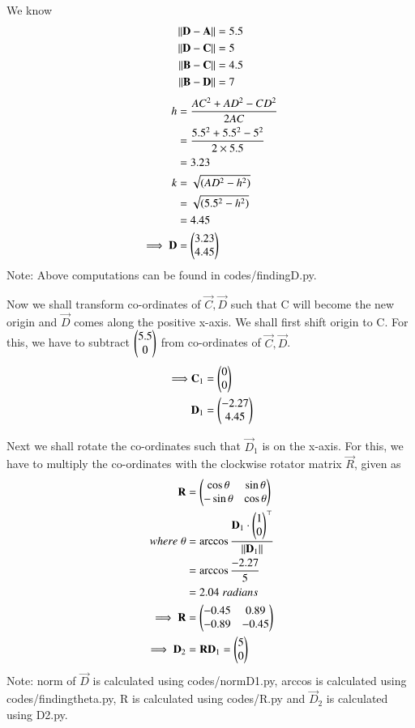 \documentclass[journal,12pt,twocolumn]{IEEEtran}
\begin{document}
We know 
\begin{align}
    \lVert\mathbf{D}-\mathbf{A}\rVert &= 5.5\label{DA}\\
    \lVert\mathbf{D}-\mathbf{C}\rVert &= 5\label{DC}\\
    \lVert\mathbf{B}-\mathbf{C}\rVert &= 4.5\label{BC}\\
    \lVert\mathbf{B}-\mathbf{D}\rVert &= 7\label{BD}
\end{align}
\begin{align}
    h &= \dfrac{AC^2+AD^2-CD^2}{2AC}\\
      &= \dfrac{5.5^2+5.5^2-5^2}{2\times 5.5}\\
      &= 3.23\\
    k &= \sqrt{(AD^2-h^2)}\\
      &= \sqrt{(5.5^2-h^2)}\\
      &= 4.45\\
    \implies \mathbf{D} &= \begin{pmatrix}3.23\\4.45\end{pmatrix}
\end{align}
Note: Above computations can be found in codes/finding\textunderscore D.py.

Now we shall transform co-ordinates of $\vec{C}, \vec{D}$ such that C will become the new origin and $\vec{D}$ comes along the positive x-axis. We shall first shift origin to C. For this, we have to subtract $\begin{pmatrix}5.5\\0\end{pmatrix}$ from co-ordinates of $\vec{C}, \vec{D}$.
\begin{align}
    \implies &\mathbf{C}_1 = \begin{pmatrix}0\\0\end{pmatrix}\\
    &\mathbf{D}_1 = \begin{pmatrix}-2.27\\4.45\end{pmatrix}
\end{align}

Next we shall rotate the co-ordinates such that $\vec{D}_1$ is on the x-axis. For this, we have to multiply the co-ordinates with the clockwise rotator matrix $\vec{R}$, given as
\begin{align}
    \mathbf{R} &= \begin{pmatrix}\cos{\theta}& \sin{\theta}\\ -\sin{\theta} & \cos{\theta}\end{pmatrix}\\
    where\; \theta &= \arccos{\dfrac{\mathbf{D}_1\cdot \ensuremath{\begin{pmatrix}1\\0\end{pmatrix}}^\top}{\lVert\mathbf{D}_1\rVert}}\\
    &= \arccos{\dfrac{-2.27}{5}}\\
    &= 2.04 \;radians\\
    \implies \mathbf{R} &= \begin{pmatrix}-0.45 & 0.89\\-0.89 & -0.45\end{pmatrix}\\
    \implies \mathbf{D}_2 &= \mathbf{R}\mathbf{D}_1 = \begin{pmatrix}5\\0\end{pmatrix}
\end{align}
Note: norm of $\vec{D}$ is calculated using codes/norm\textunderscore D1.py, arccos is calculated using codes/finding\textunderscore theta.py, R is calculated using codes/R.py and $\vec{D}_2$ is calculated using D2.py.
\end{document}

